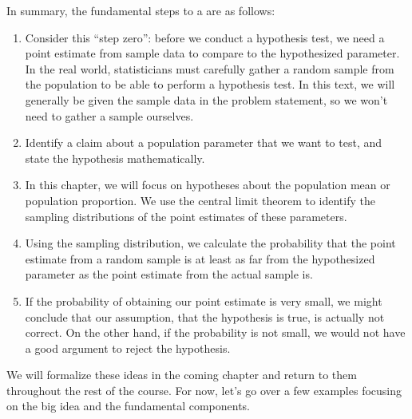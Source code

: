 \documentclass[letterpaper,10pt,english]{jupyterBook}
\begin{document}
\sphinxAtStartPar
In summary, the fundamental steps to a  are as follows:
\begin{enumerate}
%
\setcounter{enumi}{-1}
\item {} 
\sphinxAtStartPar
{}Consider this “step zero”: before we conduct a hypothesis test, we need a point estimate from sample data to compare to the hypothesized parameter. In the real world, statisticians must carefully gather a random sample from the population to be able to perform a hypothesis test. In this text, we will generally be given the sample data in the problem statement, so we won’t need to gather a sample ourselves.

\item {} 
\sphinxAtStartPar
{}Identify a claim about a population parameter that we want to test, and state the hypothesis mathematically.

\item {} 
\sphinxAtStartPar
{}In this chapter, we will focus on hypotheses about the population mean or population proportion. We use the central limit theorem to identify the sampling distributions of the point estimates of these parameters.

\item {} 
\sphinxAtStartPar
{}Using the sampling distribution, we calculate the probability that the point estimate from a random sample is at least as far from the hypothesized parameter as the point estimate from the actual sample is.

\item {} 
\sphinxAtStartPar
{}If the probability of obtaining our point estimate is very small, we might conclude that our assumption, that the hypothesis is true, is actually not correct. On the other hand, if the probability is not small, we would not have a good argument to reject the hypothesis.

\end{enumerate}

\sphinxAtStartPar
We will formalize these ideas in the coming chapter and return to them throughout the rest of the course. For now, let’s go over a few examples focusing on the big idea and the fundamental components.
\end{document}
